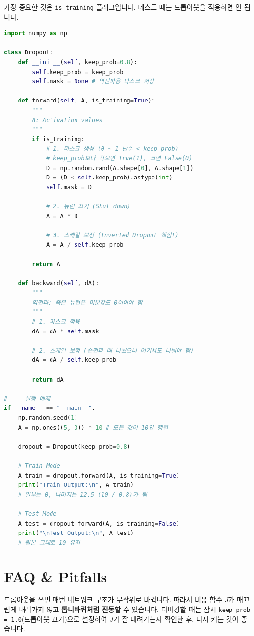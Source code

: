 \documentclass[11pt,a4paper]{book}
\theoremstyle{definition}
\begin{document}
가장 중요한 것은 \texttt{is\_training} 플래그입니다. 테스트 때는 드롭아웃을 적용하면 안 됩니다.

\begin{lstlisting}[language=Python, caption=Inverted Dropout Implementation, breaklines=true]
import numpy as np

class Dropout:
    def __init__(self, keep_prob=0.8):
        self.keep_prob = keep_prob
        self.mask = None # 역전파용 마스크 저장

    def forward(self, A, is_training=True):
        """
        A: Activation values
        """
        if is_training:
            # 1. 마스크 생성 (0 ~ 1 난수 < keep_prob)
            # keep_prob보다 작으면 True(1), 크면 False(0)
            D = np.random.rand(A.shape[0], A.shape[1])
            D = (D < self.keep_prob).astype(int)
            self.mask = D
            
            # 2. 뉴런 끄기 (Shut down)
            A = A * D
            
            # 3. 스케일 보정 (Inverted Dropout 핵심!)
            A = A / self.keep_prob
            
        return A

    def backward(self, dA):
        """
        역전파: 죽은 뉴런은 미분값도 0이어야 함
        """
        # 1. 마스크 적용
        dA = dA * self.mask
        
        # 2. 스케일 보정 (순전파 때 나눴으니 여기서도 나눠야 함)
        dA = dA / self.keep_prob
        
        return dA

# --- 실행 예제 ---
if __name__ == "__main__":
    np.random.seed(1)
    A = np.ones((5, 3)) * 10 # 모든 값이 10인 행렬
    
    dropout = Dropout(keep_prob=0.8)
    
    # Train Mode
    A_train = dropout.forward(A, is_training=True)
    print("Train Output:\n", A_train)
    # 일부는 0, 나머지는 12.5 (10 / 0.8)가 됨
    
    # Test Mode
    A_test = dropout.forward(A, is_training=False)
    print("\nTest Output:\n", A_test)
    # 원본 그대로 10 유지
\end{lstlisting}

\section{FAQ \& Pitfalls}

\begin{warningbox}[title={비용 함수(Cost Function) 진동 문제}]
드롭아웃을 쓰면 매번 네트워크 구조가 무작위로 바뀝니다. 따라서 비용 함수 $J$가 매끄럽게 내려가지 않고 \textbf{톱니바퀴처럼 진동}할 수 있습니다.
디버깅할 때는 잠시 \texttt{keep\_prob = 1.0}(드롭아웃 끄기)으로 설정하여 $J$가 잘 내려가는지 확인한 후, 다시 켜는 것이 좋습니다.
\end{warningbox}
\end{document}
